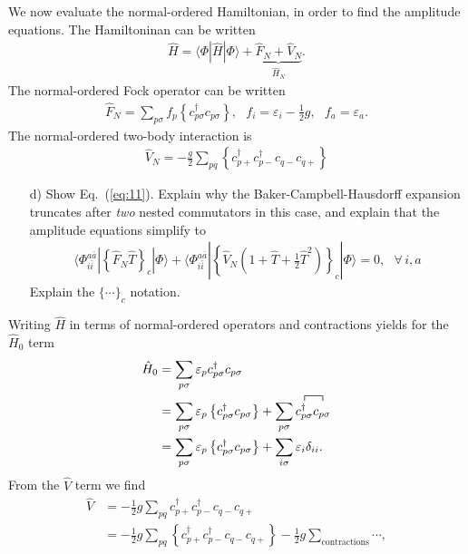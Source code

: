 \documentclass[a4paper]{article}
\newcommand{\eq} [1]{Eq.\ (\ref{eq:#1})}
\newcommand{\nn}{\nonumber}
\newcommand{\ps}{{p\sigma}}
\newcommand{\cppd}{c_{p+}^\dagger}
\newcommand{\cpmd}{c_{p-}^\dagger}
\newcommand{\cqp}{c_{q+}}
\newcommand{\cqm}{c_{q-}}
\begin{document}
\begin{exframe}
We now evaluate the normal-ordered Hamiltonian, in order to find the amplitude equations. The Hamiltoninan can be written 
\begin{align}
\hat H = \langle \Phi | \hat H |\Phi\rangle + \underbrace{\hat F_N + \hat V_N}_{\hat H_N}.
\end{align}
The normal-ordered Fock operator can be written 
\begin{align}
\hat F_N = \sum_\ps f_p \left\{ c_\ps^\dagger c_\ps \right\}, \ \ \ f_i=\varepsilon_i - \frac{1}{2}g, \ \ \ f_a=\varepsilon_a. \label{eq:11}
\end{align}
The normal-ordered two-body interaction is 
\begin{align}
\hat V_N = -\frac{g}{2}\sum_{pq} \left\{ \cppd \cpmd \cqm \cqp \right\}
\end{align}
\begin{itemize}
  \item[d)] Show \eq{11}. Explain why the Baker-Campbell-Hausdorff expansion truncates after \emph{two} nested commutators in this case, and explain that the amplitude equations simplify to
  \begin{align}
  \langle \Phi_{i\bar i}^{a \bar a} | \left\{\hat F_N \hat T \right\}_c | \Phi\rangle + \langle \Phi_{i\bar i}^{a \bar a} | \left\{\hat V_N \left(1 +\hat T + \frac{1}{2}\hat T^2\right) \right\}_c | \Phi\rangle  = 0, \ \ \ \forall \, i,a
  \end{align}
  Explain the $\{\cdots\}_c$ notation.
\end{itemize}
\end{exframe}
Writing $\hat H$ in terms of normal-ordered operators and contractions yields for the $\hat H_0$ term
\begin{align} %
\hat H_0 &= \sum_\ps \varepsilon_p c_\ps^\dagger c_\ps \nn\\
%
&= \sum_\ps \varepsilon_p\left\{ c_\ps^\dagger c_\ps \right\} + \sum_\ps \contraction[1ex]{}{c_\ps^\dagger}{}{c_\ps} c_\ps^\dagger c_\ps \nn\\
%
&= \sum_\ps \varepsilon_p\left\{ c_\ps^\dagger c_\ps \right\} + \sum_{i\sigma}\varepsilon_i \delta_{ii}.
\end{align}
From the $\hat V$ term we find 
\begin{align}
\hat V &= -\frac{1}{2}g\sum_{pq} \cppd \cpmd \cqm \cqp \nn\\
%
&= -\frac{1}{2}g\sum_{pq} \left\{\cppd \cpmd \cqm \cqp \right\} -\frac{1}{2}g\sum_\text{contractions} \cdots,
\end{align}
\end{document}
